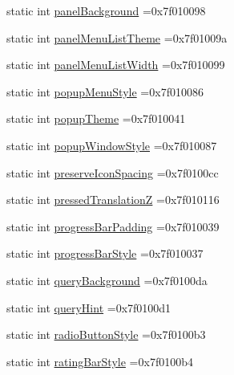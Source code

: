 \begin{DoxyCompactItemize}
static int \hyperlink{classandroid_1_1support_1_1v7_1_1cardview_1_1R_1_1attr_ae0382b2cfe69d6efa8813fb44fb5f1f6}{panel\+Background} =0x7f010098
\item 
static int \hyperlink{classandroid_1_1support_1_1v7_1_1cardview_1_1R_1_1attr_ae76b891c2296dc0263664453f122e497}{panel\+Menu\+List\+Theme} =0x7f01009a
\item 
static int \hyperlink{classandroid_1_1support_1_1v7_1_1cardview_1_1R_1_1attr_a4b602f80daf4caaeaa1f7a222674fff1}{panel\+Menu\+List\+Width} =0x7f010099
\item 
static int \hyperlink{classandroid_1_1support_1_1v7_1_1cardview_1_1R_1_1attr_a3328e29cb8910dba77e81a6963e84125}{popup\+Menu\+Style} =0x7f010086
\item 
static int \hyperlink{classandroid_1_1support_1_1v7_1_1cardview_1_1R_1_1attr_a6361a1d29dba71235a7925dc34e36e20}{popup\+Theme} =0x7f010041
\item 
static int \hyperlink{classandroid_1_1support_1_1v7_1_1cardview_1_1R_1_1attr_a1ecca8fae6e4b82298fa9804db40fbaa}{popup\+Window\+Style} =0x7f010087
\item 
static int \hyperlink{classandroid_1_1support_1_1v7_1_1cardview_1_1R_1_1attr_ade123c629c5e246957de011a6abb2d72}{preserve\+Icon\+Spacing} =0x7f0100cc
\item 
static int \hyperlink{classandroid_1_1support_1_1v7_1_1cardview_1_1R_1_1attr_af68484ea774a4ae05b7ada0004f66513}{pressed\+TranslationZ} =0x7f010116
\item 
static int \hyperlink{classandroid_1_1support_1_1v7_1_1cardview_1_1R_1_1attr_aa454ee24ba24198883f11140f1e6c87b}{progress\+Bar\+Padding} =0x7f010039
\item 
static int \hyperlink{classandroid_1_1support_1_1v7_1_1cardview_1_1R_1_1attr_ad468367fc676d8428c2d4cd2e10ed43e}{progress\+Bar\+Style} =0x7f010037
\item 
static int \hyperlink{classandroid_1_1support_1_1v7_1_1cardview_1_1R_1_1attr_a30fab5bf72caa0de9371b3efcfdd5074}{query\+Background} =0x7f0100da
\item 
static int \hyperlink{classandroid_1_1support_1_1v7_1_1cardview_1_1R_1_1attr_afe946970f8f7924556844fe1b4970eab}{query\+Hint} =0x7f0100d1
\item 
static int \hyperlink{classandroid_1_1support_1_1v7_1_1cardview_1_1R_1_1attr_a0facf965724c5a1991b6e8a0e6de92bb}{radio\+Button\+Style} =0x7f0100b3
\item 
static int \hyperlink{classandroid_1_1support_1_1v7_1_1cardview_1_1R_1_1attr_a77d242b065131572dca159bfb4618c36}{rating\+Bar\+Style} =0x7f0100b4

\end{DoxyCompactItemize}
